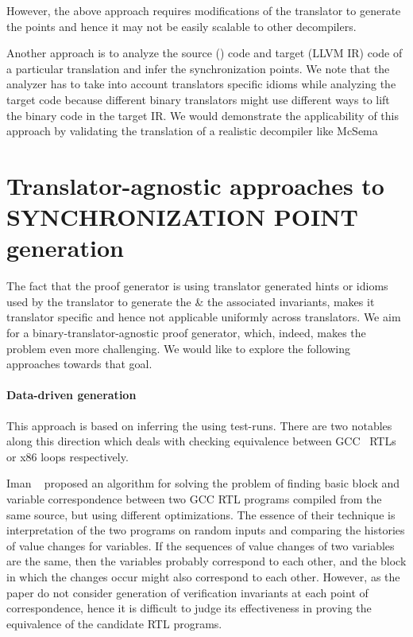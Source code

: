 However, the above approach requires modifications of the translator to
generate the \syncp points and hence it may not be easily scalable to other
decompilers. 

Another approach is to analyze the source (\ISA) code and target (LLVM IR) code
of a particular translation  and infer the synchronization points.
We note that the analyzer has to take into account translators specific idioms
while analyzing the target code because different binary translators might use
different ways to lift the binary code in the target IR. We would demonstrate
the applicability of this approach by validating the translation of a realistic
decompiler like McSema~\cite{McSema:Recon14}

\section{Translator-agnostic approaches to SYNCHRONIZATION POINT
  generation}\label{sec:TA}

The fact that the proof generator is using translator generated hints or idioms used by the translator
to  generate the \syncps \& the associated  invariants,  makes it  translator specific and hence not applicable
uniformly across translators. We aim for a  binary-translator-agnostic proof
generator, which, indeed, makes the problem  even more challenging. We would
like to explore the following  approaches towards that goal.

\paragraph{\textbf{Data-driven \syncp generation}} This approach
is based on inferring the \syncps using test-runs. There are two
notables~\cite{Iman2005,DDEC:OOPSLA:2013} along this direction which
deals with checking equivalence between GCC~\cite{GCC} RTLs or x86 loops respectively.

Iman \etal~\cite{Iman2005} proposed an algorithm for solving the problem of
finding basic block and variable correspondence between two GCC RTL programs
compiled from the same source, but using different optimizations.  The essence
of their technique is interpretation of the two programs on random inputs and
comparing the histories of value changes for variables.  If the sequences of
value changes of two variables are the same, then the variables probably
correspond to each other, and the block in which the changes occur might also
correspond to each other. However, as the paper do not consider  generation of
verification invariants  at each point of correspondence, hence it is difficult
to judge  its effectiveness in proving the equivalence of the candidate RTL
programs.     


